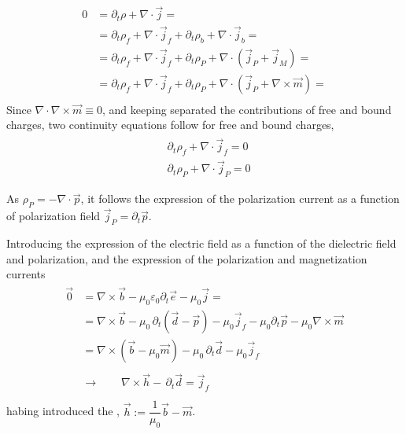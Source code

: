 \documentclass[letterpaper,10pt,english]{jupyterBook}
\begin{document}
\sphinxAtStartPar
{}
\begin{equation*}
\begin{split}
    0 
    & = \partial_t \rho + \nabla \cdot \vec{j} = \\
    & = \partial_t \rho_f + \nabla \cdot \vec{j}_f + \partial_t \rho_b + \nabla \cdot \vec{j}_b = \\
    & = \partial_t \rho_f + \nabla \cdot \vec{j}_f + \partial_t \rho_P + \nabla \cdot ( \vec{j}_P + \vec{j}_M ) = \\
    & = \partial_t \rho_f + \nabla \cdot \vec{j}_f + \partial_t \rho_P + \nabla \cdot ( \vec{j}_P + \nabla \times \vec{m} ) = \\
  \end{split}
\end{equation*}
\sphinxAtStartPar
Since \(\nabla \cdot \nabla \times \vec{m} \equiv 0\), and keeping separated the contributions of free and bound charges, two continuity equations follow for free and bound charges,
\begin{equation*}
\begin{split}\begin{aligned}
     & \partial_t \rho_f + \nabla \cdot \vec{j}_f = 0 \\
     & \partial_t \rho_P + \nabla \cdot \vec{j}_P = 0 \\ \\
  \end{aligned}\end{split}
\end{equation*}
\sphinxAtStartPar
As \(\rho_P = - \nabla \cdot \vec{p}\), it follows the expression of the polarization current as a function of polarization field \(\vec{j}_P = \partial_t \vec{p}\).

\sphinxAtStartPar
{} Introducing the expression of the electric field as a function of the dielectric field and polarization, and the expression of the polarization and magnetization currents
\begin{equation*}
\begin{split}\begin{aligned}
    \vec{0}
    & = \nabla \times \vec{b} - \mu_0 \varepsilon_0 \partial_t \vec{e} - \mu_0 \vec{j} = \\
    & = \nabla \times \vec{b} - \mu_0 \, \partial_t \left( \vec{d} - \vec{p} \right) - \mu_0 \vec{j}_f - \mu_0 \partial_t \vec{p} - \mu_0 \nabla \times \vec{m} \\
    & = \nabla \times \left( \vec{b} - \mu_0 \vec{m} \right) - \mu_0 \, \partial_t \vec{d} - \mu_0 \vec{j}_f \\ \\ 
    & \rightarrow \qquad \nabla \times \vec{h}  - \, \partial_t \vec{d} = \vec{j}_f \\
  \end{aligned}\end{split}
\end{equation*}
\sphinxAtStartPar
habing introduced the , \(\vec{h} := \dfrac{1}{\mu_0} \vec{b} - \vec{m}\).
\end{document}
